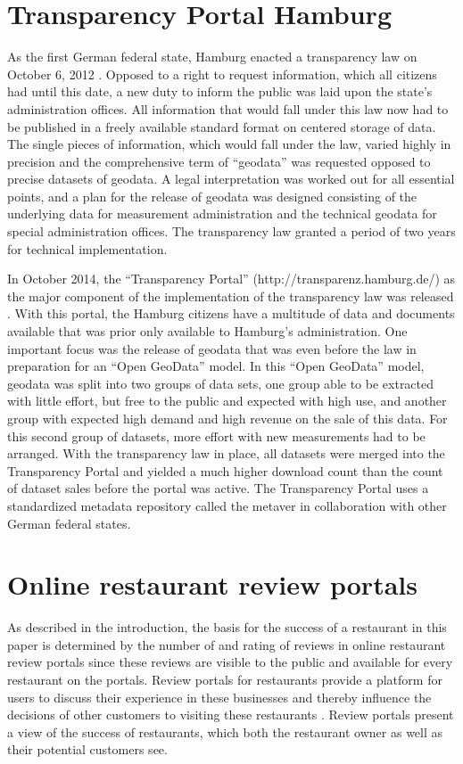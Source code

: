 \documentclass[a4paper, 11pt, oneside]{Thesis}  %
\begin{document}
\section{Transparency Portal Hamburg}
As the first German federal state, Hamburg enacted a transparency law on October 6, 2012 \cite{Murjahn.2016}. Opposed to a right to request information, which all citizens had until this date, a new duty to inform the public was laid upon the state’s administration offices. All information that would fall under this law now had to be published in a freely available standard format on centered storage of data. The single pieces of information, which would fall under the law, varied highly in precision and the comprehensive term of ``geodata'' was requested opposed to precise datasets of geodata. A legal interpretation was worked out for all essential points, and a plan for the release of geodata was designed consisting of the underlying data for measurement administration and the technical geodata for special administration offices. The transparency law granted a period of two years for technical implementation.

In October 2014, the ``Transparency Portal'' (http://transparenz.hamburg.de/) as the major component of the implementation of the transparency law was released \cite{Murjahn.2016}. With this portal, the Hamburg citizens have a multitude of data and documents available that was prior only available to Hamburg's administration. One important focus was the release of geodata that was even before the law in preparation for an ``Open GeoData'' model. In this ``Open GeoData'' model, geodata was split into two groups of data sets, one group able to be extracted with little effort, but free to the public and expected with high use, and another group with expected high demand and high revenue on the sale of this data. For this second group of datasets, more effort with new measurements had to be arranged. With the transparency law in place, all datasets were merged into the Transparency Portal and yielded a much higher download count than the count of dataset sales before the portal was active. The Transparency Portal uses a standardized metadata repository called the \ac{metaver} in collaboration with other German federal states.

\section{Online restaurant review portals}

As described in the introduction, the basis for the success of a restaurant in this paper is determined by the number of and rating of reviews in online restaurant review portals since these reviews are visible to the public and available for every restaurant on the portals. Review portals for restaurants provide a platform for users to discuss their experience in these businesses and thereby influence the decisions of other customers to visiting these restaurants \cite{Mellet.2014}. Review portals present a view of the success of restaurants, which both the restaurant owner as well as their potential customers see.
\end{document}
